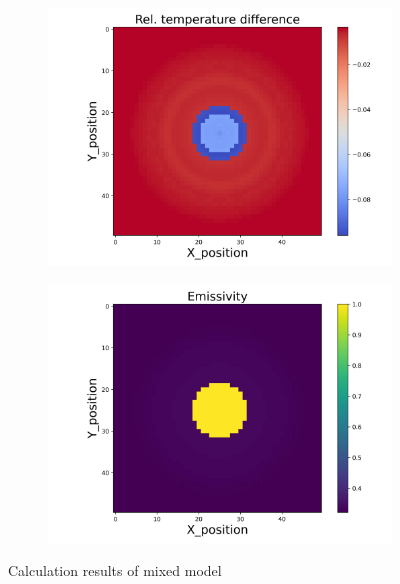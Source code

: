 \begin{figure}[htbp]
    \begin{minipage}{\textwidth}
        \centering
        \begin{subfigure}{0.49\textwidth}
            \centering
            \includegraphics[width=\textwidth]{figures/raw_data/5/mix/T_bias.jpg}
        \end{subfigure}
        \begin{subfigure}{0.49\textwidth}
            \centering
            \includegraphics[width=\textwidth]{figures/raw_data/5/mix/emi_cal.jpg}
        \end{subfigure}
    \end{minipage}
    \caption{Calculation results of mixed model}
    \label{fig: result_mixed_model}
\end{figure}


